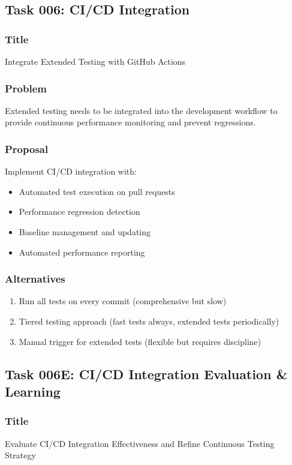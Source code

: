 \documentclass[11pt,a4paper]{article}
\begin{document}
\subsection{Task 006: CI/CD Integration}

\subsubsection{Title}
Integrate Extended Testing with GitHub Actions

\subsubsection{Problem}
Extended testing needs to be integrated into the development workflow to provide continuous performance monitoring and prevent regressions.

\subsubsection{Proposal}
Implement CI/CD integration with:
\begin{itemize}
    \item Automated test execution on pull requests
    \item Performance regression detection
    \item Baseline management and updating
    \item Automated performance reporting
\end{itemize}

\subsubsection{Alternatives}
\begin{enumerate}
    \item Run all tests on every commit (comprehensive but slow)
    \item Tiered testing approach (fast tests always, extended tests periodically)
    \item Manual trigger for extended tests (flexible but requires discipline)
\end{enumerate}

\subsection{Task 006E: CI/CD Integration Evaluation \& Learning}

\subsubsection{Title}
Evaluate CI/CD Integration Effectiveness and Refine Continuous Testing Strategy
\end{document}
